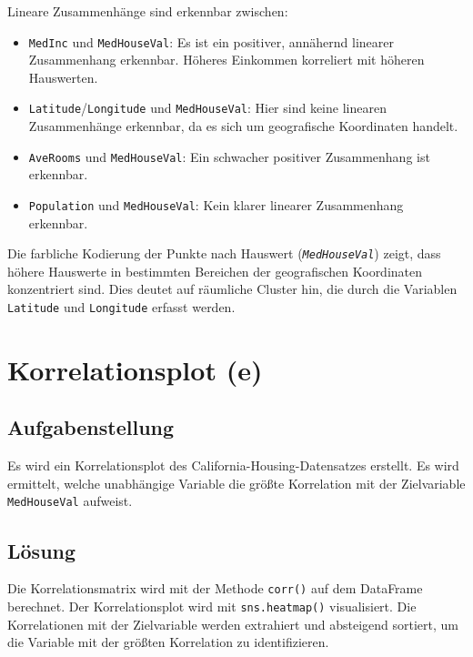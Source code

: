 Lineare Zusammenhänge sind erkennbar zwischen:

\begin{itemize}
    \item \texttt{MedInc} und \texttt{MedHouseVal}: Es ist ein positiver, annähernd linearer Zusammenhang erkennbar. Höheres Einkommen korreliert mit höheren Hauswerten.
    \item \texttt{Latitude}/\texttt{Longitude} und \texttt{MedHouseVal}: Hier sind keine linearen Zusammenhänge erkennbar, da es sich um geografische Koordinaten handelt.
    \item \texttt{AveRooms} und \texttt{MedHouseVal}: Ein schwacher positiver Zusammenhang ist erkennbar.
    \item \texttt{Population} und \texttt{MedHouseVal}: Kein klarer linearer Zusammenhang erkennbar.
\end{itemize}

Die farbliche Kodierung der Punkte nach Hauswert (\textit{\texttt{MedHouseVal}}) zeigt, dass höhere Hauswerte in bestimmten Bereichen der geografischen Koordinaten konzentriert sind. Dies deutet auf räumliche Cluster hin, die durch die Variablen \texttt{Latitude} und \texttt{Longitude} erfasst werden.

\cleardoublepage


\section{Korrelationsplot (e)}
\label{sec:2e}

\subsection{Aufgabenstellung}

Es wird ein Korrelationsplot des California-Housing-Datensatzes erstellt. Es wird ermittelt, welche unabhängige Variable die größte Korrelation mit der Zielvariable \texttt{MedHouseVal} aufweist.

\subsection{Lösung}

Die Korrelationsmatrix wird mit der Methode \texttt{corr()} auf dem DataFrame berechnet. Der Korrelationsplot wird mit \texttt{sns.heatmap()} visualisiert. Die Korrelationen mit der Zielvariable werden extrahiert und absteigend sortiert, um die Variable mit der größten Korrelation zu identifizieren.

